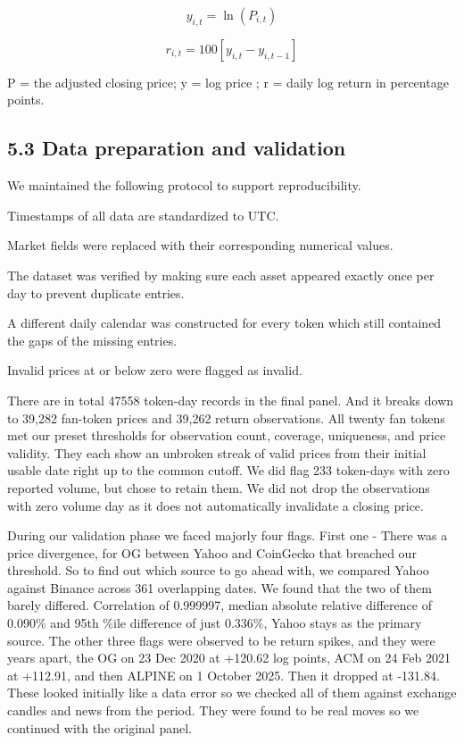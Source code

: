 \documentclass[11pt,a4paper,onecolumn]{article}
\begin{document}
\[
y_{i,t}=\ln(P_{i,t})
\]

\[
r_{i,t}=100[y_{i,t}-y_{i,t-1}]
\]

P =  the adjusted closing price; y = log price ;  r =  daily log return in percentage points.

\subsection{5.3 Data preparation and validation}

We maintained the following protocol to support reproducibility.

Timestamps of all data are standardized to UTC.

Market fields were replaced with their corresponding numerical values.

The dataset was verified by making sure each asset appeared exactly once per day to prevent duplicate entries.

A different daily calendar was constructed for every token which still contained the gaps of the missing entries.

Invalid prices at or below zero were flagged as invalid.

There are in total 47558 token-day records in the final panel. And it breaks down to 39,282 fan-token prices and 39,262 return observations. All twenty fan tokens met our preset thresholds for observation count, coverage, uniqueness, and price validity. They each show an unbroken streak of valid prices from their initial usable date right up to the common cutoff. We did flag 233 token-days with zero reported volume, but chose to retain them. We did not drop the observations with zero volume day as it does not automatically invalidate a closing price.

During our validation phase we faced majorly four flags. First one - There was a price divergence, for OG between Yahoo and CoinGecko that breached our threshold. So to find out which source to go ahead with, we compared Yahoo against Binance across 361 overlapping dates. We found that the two of them barely differed. Correlation of 0.999997, median absolute relative difference of 0.090\% and 95th \%ile difference of just 0.336\%, Yahoo stays as the primary source. The other three flags were observed to be return spikes, and they were years apart, the OG on 23 Dec 2020 at +120.62 log points, ACM on 24 Feb 2021 at +112.91, and then ALPINE on 1 October 2025. Then it dropped at -131.84. These looked initially like a data error so we checked all of them against exchange candles and news from the period. They were found to be real moves so we continued with the original panel.
\end{document}
